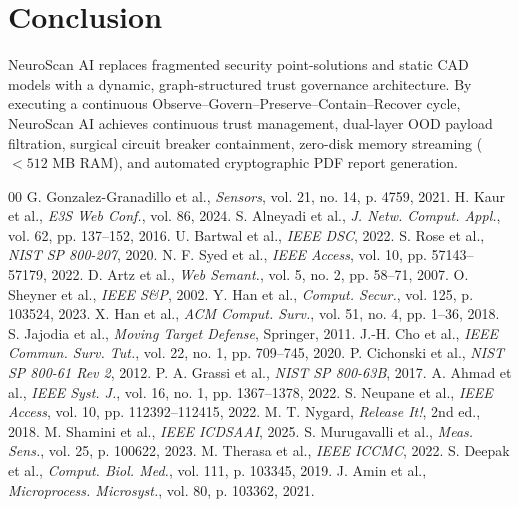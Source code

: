 \documentclass[conference]{IEEEtran}
\begin{document}
\section{Conclusion}
NeuroScan AI replaces fragmented security point-solutions and static CAD models with a dynamic, graph-structured trust governance architecture. By executing a continuous Observe--Govern--Preserve--Contain--Recover cycle, NeuroScan AI achieves continuous trust management, dual-layer OOD payload filtration, surgical circuit breaker containment, zero-disk memory streaming ($< 512$ MB RAM), and automated cryptographic PDF report generation.

\begin{thebibliography}{00}
 G. Gonzalez-Granadillo et al., \textit{Sensors}, vol. 21, no. 14, p. 4759, 2021.
 H. Kaur et al., \textit{E3S Web Conf.}, vol. 86, 2024.
 S. Alneyadi et al., \textit{J. Netw. Comput. Appl.}, vol. 62, pp. 137--152, 2016.
 U. Bartwal et al., \textit{IEEE DSC}, 2022.
 S. Rose et al., \textit{NIST SP 800-207}, 2020.
 N. F. Syed et al., \textit{IEEE Access}, vol. 10, pp. 57143--57179, 2022.
 D. Artz et al., \textit{Web Semant.}, vol. 5, no. 2, pp. 58--71, 2007.
 O. Sheyner et al., \textit{IEEE S\&P}, 2002.
 Y. Han et al., \textit{Comput. Secur.}, vol. 125, p. 103524, 2023.
 X. Han et al., \textit{ACM Comput. Surv.}, vol. 51, no. 4, pp. 1--36, 2018.
 S. Jajodia et al., \textit{Moving Target Defense}, Springer, 2011.
 J.-H. Cho et al., \textit{IEEE Commun. Surv. Tut.}, vol. 22, no. 1, pp. 709--745, 2020.
 P. Cichonski et al., \textit{NIST SP 800-61 Rev 2}, 2012.
 P. A. Grassi et al., \textit{NIST SP 800-63B}, 2017.
 A. Ahmad et al., \textit{IEEE Syst. J.}, vol. 16, no. 1, pp. 1367--1378, 2022.
 S. Neupane et al., \textit{IEEE Access}, vol. 10, pp. 112392--112415, 2022.
 M. T. Nygard, \textit{Release It!}, 2nd ed., 2018.
 M. Shamini et al., \textit{IEEE ICDSAAI}, 2025.
 S. Murugavalli et al., \textit{Meas. Sens.}, vol. 25, p. 100622, 2023.
 M. Therasa et al., \textit{IEEE ICCMC}, 2022.
 S. Deepak et al., \textit{Comput. Biol. Med.}, vol. 111, p. 103345, 2019.
 J. Amin et al., \textit{Microprocess. Microsyst.}, vol. 80, p. 103362, 2021.

\end{thebibliography}
\end{document}
